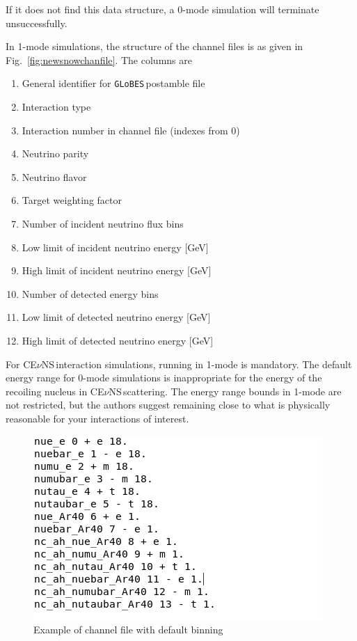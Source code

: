 \documentclass{article}
\newcommand{\cev}{CE$\nu$NS\,}
\newcommand{\glb}{\texttt{GLoBES}\,}
\begin{document}
\noindent If it does not find this data structure, a 0-mode simulation will terminate unsuccessfully.

In 1-mode simulations, the structure of the channel files is as given in Fig.~\ref{fig:newsnowchanfile}. The columns are

\begin{adjustwidth}{2cm}{}
    \begin{enumerate}
        \item General identifier for \glb postamble file
        \item Interaction type
        \item Interaction number in channel file (indexes from 0)
        \item Neutrino parity
        \item Neutrino flavor
        \item Target weighting factor
        \item Number of incident neutrino flux bins
        \item Low limit of incident neutrino energy [GeV]
        \item High limit of incident neutrino energy [GeV]
        \item Number of detected energy bins
        \item Low limit of detected neutrino energy [GeV]
        \item High limit of detected neutrino energy [GeV]
    \end{enumerate}
\end{adjustwidth}

For \cev interaction simulations, running in 1-mode is mandatory. The default energy range for 0-mode simulations is inappropriate for the energy of the recoiling nucleus in \cev scattering. The energy range bounds in 1-mode are not restricted, but the authors suggest remaining close to what is physically reasonable for your interactions of interest.

\begin{figure}[h]
    \centering
    \includegraphics[scale=0.6]{figures/oldSNOWGLOBESchannelfile.png}
    \caption{Example of channel file with default binning}
    \label{fig:oldsnowchanfile}
\end{figure}
\end{document}

